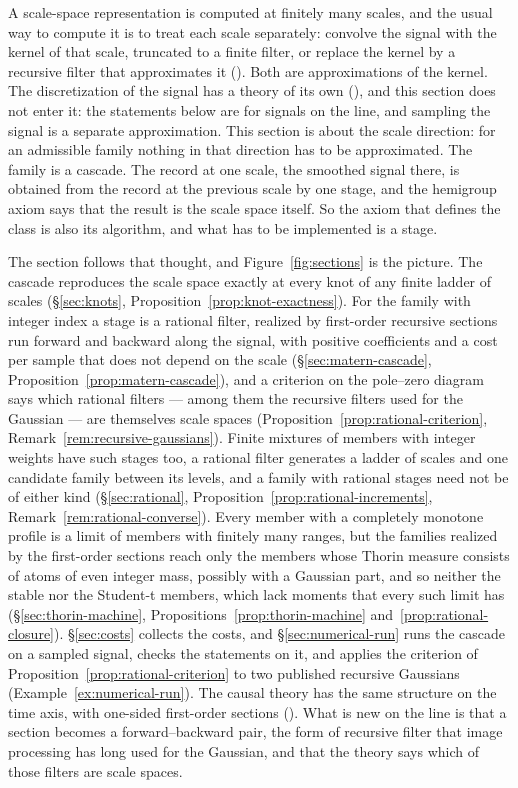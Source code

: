 A scale-space representation is computed at finitely many scales, and the usual way to compute
it is to treat each scale separately: convolve the signal with the kernel of that scale,
truncated to a finite filter, or replace the kernel by a recursive filter that approximates
it (). Both are approximations of the kernel. The discretization of the signal has a theory of
its own (), and this section does not enter it: the statements
below are for signals on the line, and sampling the signal is a separate approximation. This
section is about the scale direction: for an admissible family nothing in that direction has
to be approximated. The family is a cascade. The record at one scale, the smoothed signal
there, is obtained from the record at the
previous scale by one stage, and the hemigroup axiom says that the result is the scale space
itself. So the axiom that defines the class is also its
algorithm, and what has to be implemented is a stage.

The section follows that thought, and Figure~\ref{fig:sections} is the picture. The cascade
reproduces the scale space exactly at every knot of any finite ladder of scales
(\S\ref{sec:knots}, Proposition~\ref{prop:knot-exactness}). For the \Matern{} family with
integer index a stage is a rational filter, realized by first-order recursive sections run
forward and backward along the signal, with positive coefficients and a cost per sample that
does not depend on the scale (\S\ref{sec:matern-cascade},
Proposition~\ref{prop:matern-cascade}), and a criterion on the pole--zero diagram says which
rational filters --- among them the recursive filters used for the Gaussian --- are themselves
scale spaces (Proposition~\ref{prop:rational-criterion},
Remark~\ref{rem:recursive-gaussians}). Finite
mixtures of \Matern{} members with integer weights have such stages too, a rational filter
generates a ladder of scales and one candidate family between its levels, and a family with
rational stages need not be of either kind (\S\ref{sec:rational},
Proposition~\ref{prop:rational-increments}, Remark~\ref{rem:rational-converse}). Every member
with a completely monotone profile is a limit of members with finitely many ranges, but the
families realized by the first-order sections reach only the members whose Thorin measure
consists of atoms of even integer mass, possibly with a Gaussian part, and so neither the
stable nor the Student-t members, which lack moments that every such limit has
(\S\ref{sec:thorin-machine}, Propositions~\ref{prop:thorin-machine}
and~\ref{prop:rational-closure}). \S\ref{sec:costs} collects the costs, and
\S\ref{sec:numerical-run} runs the cascade on a sampled signal, checks the statements on it,
and applies the criterion of Proposition~\ref{prop:rational-criterion} to two published
recursive Gaussians
(Example~\ref{ex:numerical-run}).
The causal theory has the same structure on the time axis, with one-sided first-order
sections (). What is new on the line is that a section becomes
a forward--backward pair, the form of recursive filter that image processing has long used for
the Gaussian, and that the theory says which of those filters are scale spaces.

